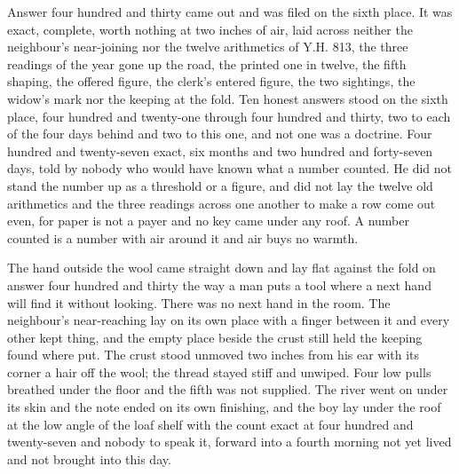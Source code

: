 Answer four hundred and thirty came out and was filed on the sixth place. It was exact, complete, worth nothing at two inches of air, laid across neither the neighbour's near-joining nor the twelve arithmetics of Y.H. 813, the three readings of the year gone up the road, the printed one in twelve, the fifth shaping, the offered figure, the clerk's entered figure, the two sightings, the widow's mark nor the keeping at the fold. Ten honest answers stood on the sixth place, four hundred and twenty-one through four hundred and thirty, two to each of the four days behind and two to this one, and not one was a doctrine. Four hundred and twenty-seven exact, six months and two hundred and forty-seven days, told by nobody who would have known what a number counted. He did not stand the number up as a threshold or a figure, and did not lay the twelve old arithmetics and the three readings across one another to make a row come out even, for paper is not a payer and no key came under any roof. A number counted is a number with air around it and air buys no warmth.

The hand outside the wool came straight down and lay flat against the fold on answer four hundred and thirty the way a man puts a tool where a next hand will find it without looking. There was no next hand in the room. The neighbour's near-reaching lay on its own place with a finger between it and every other kept thing, and the empty place beside the crust still held the keeping found where put. The crust stood unmoved two inches from his ear with its corner a hair off the wool; the thread stayed stiff and unwiped. Four low pulls breathed under the floor and the fifth was not supplied. The river went on under its skin and the note ended on its own finishing, and the boy lay under the roof at the low angle of the loaf shelf with the count exact at four hundred and twenty-seven and nobody to speak it, forward into a fourth morning not yet lived and not brought into this day.

